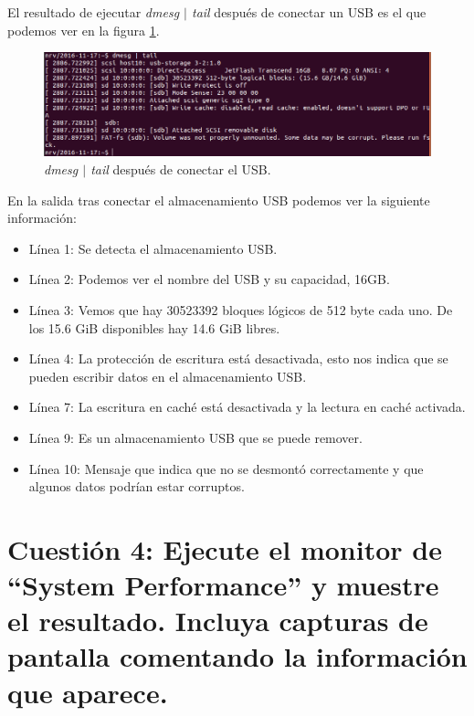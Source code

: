 \documentclass[a4paper,titlepage,12pt]{scrartcl}	%
\numberwithin{figure}{section} %
\numberwithin{table}{section} %
\begin{document}
	El resultado de ejecutar \textit{dmesg $\mid$ tail} después de conectar un USB es el que podemos ver en la figura \ref{3-despues}.
	
	\begin{figure}[H]
		\includegraphics[width=\linewidth]{./Imagenes/3-despues.png}
		\vspace{-0.5cm}
		\caption[\textit{dmesg $\mid$ tail} después de conectar el USB.]{\textit{dmesg $\mid$ tail} después de conectar el USB.}
		\label{3-despues}
	\end{figure}
	
	En la salida tras conectar el almacenamiento USB podemos ver la siguiente información: 
	\begin{itemize}
		\item Línea 1: Se detecta el almacenamiento USB.
		\item Línea 2: Podemos ver el nombre del USB y su capacidad, 16GB.
		\item Línea 3: Vemos que hay 30523392 bloques lógicos de 512 byte cada uno. De los 15.6 GiB disponibles hay 14.6 GiB libres.
		\item Línea 4: La protección de escritura está desactivada, esto nos indica que se pueden escribir datos en el almacenamiento USB.
		\item Línea 7: La escritura en caché está desactivada y la lectura en caché activada.
		\item Línea 9: Es un almacenamiento USB que se puede remover.
		\item Línea 10: Mensaje que indica que no se desmontó correctamente y que algunos datos podrían estar corruptos.
	\end{itemize}
	
	\section[Cuestión 4: Ejecute el monitor de “System Performance” y muestre el resultado. Incluya capturas de pantalla comentando la información que aparece.]{Cuestión 4: Ejecute el monitor de “System Performance” y muestre el resultado. Incluya capturas de pantalla comentando la información que aparece.}
	
\end{document}
